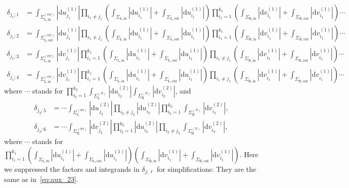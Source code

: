 \documentclass{article}
\numberwithin{equation}{section}
\newcommand{\exe}{\mathrm{err}}
\newcommand{\inn}{\mathrm{in}}
\newcommand{\LL}{\mathrm{L}}
\newcommand{\out}{\mathrm{out}}
\newcommand{\RR}{\mathrm{R}}
\begin{document}
\begin{equation*}
	\begin{split}
	\delta_{j_1;1}&=\int_{\Sigma_{\LL,\inn}^{(\exe)}}|\mathrm{d}u^{(1)}_{j_1}|\prod_{i_1\ne j_1}\left(  \int_{\Sigma_{\LL,\inn}}|\mathrm{d}u^{(1)}_{i_1}|
	+\int_{\Sigma_{\LL,\out}}|\mathrm{d}u^{(1)}_{i_1}|
	\right)
	\prod_{i_1=1}^{k_1}\left( \int_{\Sigma_{\RR,\inn}}  |\mathrm{d}v^{(1)}_{i_1}|
	+ \int_{\Sigma_{\RR,\out}}|\mathrm{d}v^{(1)}_{i_1}|
	\right)\cdots\\
	\delta_{j_1;2}&=\int_{\Sigma_{\LL,\out}^{(\exe)}}|\mathrm{d}u^{(1)}_{j_1}|\prod_{i_1\ne j_1}\left(  \int_{\Sigma_{\LL,\inn}}|\mathrm{d}u^{(1)}_{i_1}|
	+\int_{\Sigma_{\LL,\out}}|\mathrm{d}u^{(1)}_{i_1}|
	\right)
	\prod_{i_1=1}^{k_1}\left( \int_{\Sigma_{\RR,\inn}}  |\mathrm{d}v^{(1)}_{i_1}|
	+ \int_{\Sigma_{\RR,\out}}|\mathrm{d}v^{(1)}_{i_1}|
	\right)\cdots\\
	\delta_{j_1;3}&=\int_{\Sigma_{\LL,\inn}^{(\exe)}}|\mathrm{d}v^{(1)}_{j_1}|\prod_{i_1=1}^{k_1}\left(  \int_{\Sigma_{\LL,\inn}}|\mathrm{d}u^{(1)}_{i_1}|
	+\int_{\Sigma_{\LL,\out}}|\mathrm{d}u^{(1)}_{i_1}|
	\right)
	\prod_{i_1\ne j_1}\left( \int_{\Sigma_{\RR,\inn}}  |\mathrm{d}v^{(1)}_{i_1}|
	+ \int_{\Sigma_{\RR,\out}}|\mathrm{d}v^{(1)}_{i_1}|
	\right)\cdots\\
	\delta_{j_1;4}&=\int_{\Sigma_{\LL,\inn}^{(\exe)}}|\mathrm{d}v^{(1)}_{j_1}|\prod_{i_1=1}^{k_1}\left(  \int_{\Sigma_{\LL,\inn}}|\mathrm{d}u^{(1)}_{i_1}|
	+\int_{\Sigma_{\LL,\out}}|\mathrm{d}u^{(1)}_{i_1}|
	\right)
	\prod_{i_1\ne j_1}\left( \int_{\Sigma_{\RR,\inn}}  |\mathrm{d}v^{(1)}_{i_1}|
	+ \int_{\Sigma_{\RR,\out}}|\mathrm{d}v^{(1)}_{i_1}|
	\right)\cdots
	\end{split}
\end{equation*}
where $\cdots$ stands for $\prod_{i_2=1}^{k_2}  
\int_{\Sigma_\LL^{(N)}} |\mathrm{d}u^{(2)}_{i_2}| 
\int_{\Sigma_\RR^{(N)}} |\mathrm{d}v^{(2)}_{i_2}|$, and
\begin{equation*}
	\begin{split}
		\delta_{j_2;5}&=\cdots \int_{\Sigma_{\LL}^{(\exe)}}|\mathrm{d}u^{(2)}_{j_2}|\prod_{i_2\ne j_2}|\mathrm{d}u^{(2)}_{i_2}|
		\prod_{i_2=1}^{k_2}  
		\int_{\Sigma_\RR^{(N)}} |\mathrm{d}v^{(2)}_{i_2}|,\\
		\delta_{j_2;6}&=\cdots \int_{\Sigma_{\RR}^{(\exe)}}|\mathrm{d}v^{(2)}_{j_2}|\prod_{i_2=1 }^{k_2}|\mathrm{d}u^{(2)}_{i_2}|
		\prod_{i_2\ne j_2}  
		\int_{\Sigma_\RR^{(N)}} |\mathrm{d}v^{(2)}_{i_2}|,
	\end{split}
\end{equation*}
where $\cdots$ stands for $\prod_{i_1=1}^{k_1}\left(  \int_{\Sigma_{\LL,\inn}}|\mathrm{d}u^{(1)}_{i_1}|
+\int_{\Sigma_{\LL,\out}}|\mathrm{d}u^{(1)}_{i_1}|
\right)
\left( \int_{\Sigma_{\RR,\inn}}  |\mathrm{d}v^{(1)}_{i_1}|
+ \int_{\Sigma_{\RR,\out}}|\mathrm{d}v^{(1)}_{i_1}|
\right)$. Here we suppressed the factors and integrands in $\delta_{j;\ell}$ for simplifications: They are the same as in~\eqref{eq:aux_23}.
\end{document}
